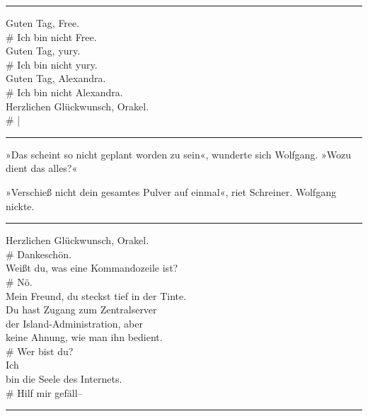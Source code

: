 \noindent \parbox{\textwidth}{ \vspace{3ex} \hrule \vspace{3ex}

    \begin{tiny}
    \begin{ttfamily}

\noindent Guten Tag, Free.\\
\noindent \# Ich bin nicht Free.\\
\noindent Guten Tag, yury.\\
\noindent \# Ich bin nicht yury.\\
\noindent Guten Tag, Alexandra.\\
\noindent \# Ich bin nicht Alexandra.\\
\noindent Herzlichen Glückwunsch, Orakel.\\
\noindent \# |

    \end{ttfamily}
    \end{tiny}

\vspace{3ex} \hrule \vspace{3ex} }

»Das scheint so nicht geplant worden zu sein«, wunderte sich Wolfgang. »Wozu dient das alles?«

»Verschieß nicht dein gesamtes Pulver auf einmal«, riet Schreiner. Wolfgang nickte.

\noindent \parbox{\textwidth}{ \vspace{3ex} \hrule \vspace{3ex}

    \begin{tiny}
    \begin{ttfamily}

\noindent Herzlichen Glückwunsch, Orakel.\\
\noindent \# Dankeschön.\\
\noindent Weißt du, was eine Kommandozeile ist?\\
\noindent \# Nö.\\
\noindent Mein Freund, du steckst tief in der Tinte.\\
\noindent Du hast Zugang zum Zentralserver\\
\noindent der Island-Administration, aber\\
\noindent keine Ahnung, wie man ihn bedient.\\
\noindent \# Wer bist du?\\
\noindent Ich\\
\noindent bin die Seele des Internets.\\
\noindent \# Hilf mir gefäll–

    \end{ttfamily}
    \end{tiny}

\vspace{3ex} \hrule \vspace{3ex} }

